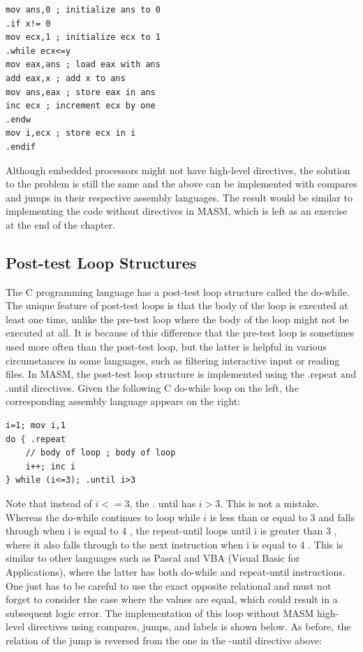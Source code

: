 \documentclass[10pt]{article}
\begin{document}
\begin{verbatim}
mov ans,0 ; initialize ans to 0
.if x!= 0
mov ecx,1 ; initialize ecx to 1
.while ecx<=y
mov eax,ans ; load eax with ans
add eax,x ; add x to ans
mov ans,eax ; store eax in ans
inc ecx ; increment ecx by one
.endw
mov i,ecx ; store ecx in i
.endif
\end{verbatim}

Although embedded processors might not have high-level directives, the solution to the problem is still the same and the above can be implemented with compares and jumps in their respective assembly languages. The result would be similar to implementing the code without directives in MASM, which is left as an exercise at the end of the chapter.

\subsection*{Post-test Loop Structures}
The C programming language has a post-test loop structure called the do-while. The unique feature of post-test loops is that the body of the loop is executed at least one time, unlike the pre-test loop where the body of the loop might not be executed at all. It is because of this difference that the pre-test loop is sometimes used more often than the post-test loop, but the latter is helpful in various circumstances in some languages, such as filtering interactive input or reading files. In MASM, the post-test loop structure is implemented using the .repeat and .until directives. Given the following C do-while loop on the left, the corresponding assembly language appears on the right:

\begin{verbatim}
i=1; mov i,1
do { .repeat
    // body of loop ; body of loop
    i++; inc i
} while (i<=3); .until i>3
\end{verbatim}

Note that instead of $i<=3$, the . until has $i>3$. This is not a mistake. Whereas the do-while continues to loop while $i$ is less than or equal to 3 and falls through when i is equal to 4 , the repeat-until loops until i is greater than 3 , where it also falls through to the next instruction when i is equal to 4 . This is similar to other languages such as Pascal and VBA (Visual Basic for Applications), where the latter has both do-while and repeat-until instructions. One just has to be careful to use the exact opposite relational and must not forget to consider the case where the values are equal, which could result in a subsequent logic error. The implementation of this loop without MASM high-level directives using compares, jumps, and labels is shown below. As before, the relation of the jump is reversed from the one in the -until directive above:
\end{document}
